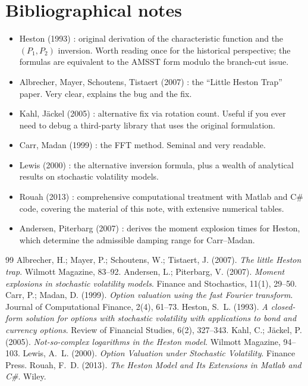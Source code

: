 \documentclass[11pt]{article}
\theoremstyle{plain}
\theoremstyle{definition}
\theoremstyle{remark}
\begin{document}
\section{Bibliographical notes}

\begin{itemize}[topsep=2pt]
    \item Heston (1993) \cite{Heston1993}: original derivation of the characteristic function and the \((P_1, P_2)\) inversion. Worth reading once for the historical perspective; the formulas are equivalent to the AMSST form modulo the branch-cut issue.
    \item Albrecher, Mayer, Schoutens, Tistaert (2007) \cite{AMSS2007}: the ``Little Heston Trap'' paper. Very clear, explains the bug and the fix.
    \item Kahl, J\"ackel (2005) \cite{KahlJaeckel2005}: alternative fix via rotation count. Useful if you ever need to debug a third-party library that uses the original formulation.
    \item Carr, Madan (1999) \cite{CarrMadan1999}: the FFT method. Seminal and very readable.
    \item Lewis (2000) \cite{Lewis2000}: the alternative inversion formula, plus a wealth of analytical results on stochastic volatility models.
    \item Rouah (2013) \cite{Rouah2013}: comprehensive computational treatment with Matlab and C\# code, covering the material of this note, with extensive numerical tables.
    \item Andersen, Piterbarg (2007) \cite{AndersenPiterbarg2007}: derives the moment explosion times for Heston, which determine the admissible damping range for Carr--Madan.
\end{itemize}

\begin{thebibliography}{99}
                  Albrecher, H.; Mayer, P.; Schoutens, W.; Tistaert, J. (2007). \emph{The little Heston trap}. Wilmott Magazine, 83--92.
     Andersen, L.; Piterbarg, V. (2007). \emph{Moment explosions in stochastic volatility models}. Finance and Stochastics, 11(1), 29--50.
             Carr, P.; Madan, D. (1999). \emph{Option valuation using the fast Fourier transform}. Journal of Computational Finance, 2(4), 61--73.
                Heston, S.~L. (1993). \emph{A closed-form solution for options with stochastic volatility with applications to bond and currency options}. Review of Financial Studies, 6(2), 327--343.
           Kahl, C.; J\"ackel, P. (2005). \emph{Not-so-complex logarithms in the Heston model}. Wilmott Magazine, 94--103.
                 Lewis, A.~L. (2000). \emph{Option Valuation under Stochastic Volatility}. Finance Press.
                 Rouah, F.~D. (2013). \emph{The Heston Model and Its Extensions in Matlab and C\#}. Wiley.
\end{thebibliography}
\end{document}
